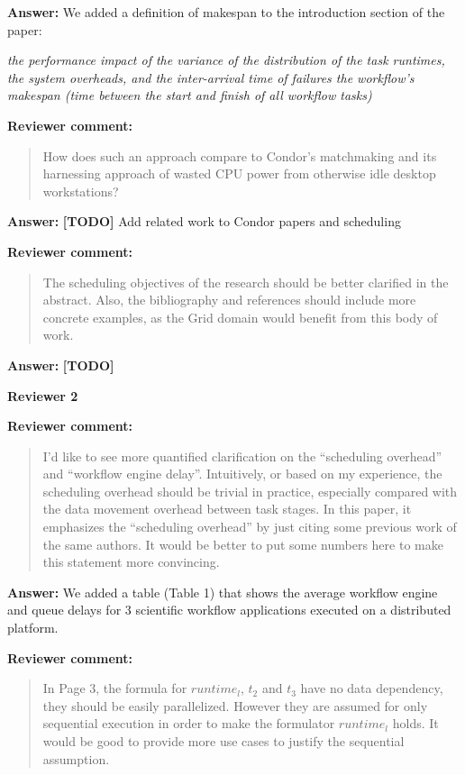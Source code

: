 \documentclass{letter}
\newenvironment{review}%
{\textbf{Reviewer comment:}\begin{quote}}%
{\end{quote}}%
\newcommand{\todo}[1]{%
      \color{red}\textbf{[TODO]} #1\color{black}}
\newcommand{\answer}[1]{%
      \textbf{Answer:} #1}
\newcommand{\revised}[1]{\emph{#1}\color{black}}
\begin{document}
\begin{letter}{}
\answer{We added a definition of makespan to the introduction section of the paper:}

\revised{the performance impact of the variance of the distribution of the task runtimes, the system overheads, and the inter-arrival time of failures the workflow's makespan (time between the start and finish of all workflow tasks)}



\begin{review}
How does such an approach compare to Condor's matchmaking and its harnessing approach of wasted CPU power from otherwise idle desktop workstations?
\end{review}

\answer{\todo{Add related work to Condor papers and scheduling}}



\begin{review}
The scheduling objectives of the research should be better clarified in the abstract. Also, the bibliography and references should include more concrete examples, as the Grid domain would benefit from this body of work. 
\end{review}

\answer{\todo{}}



\newpage

%
%
\textbf{Reviewer 2}

\begin{review}
I'd like to see more quantified clarification on the ``scheduling overhead'' and ``workflow engine delay''. Intuitively, or based on my experience, the scheduling overhead should be trivial in practice, especially compared with the data movement overhead between task stages. In this paper, it emphasizes the ``scheduling overhead'' by just citing some previous work of the same authors. It would be better to put some numbers here to make this statement more convincing. 
\end{review}

\answer{We added a table (Table 1) that shows the average workflow engine and queue delays for 3 scientific workflow applications executed on a distributed platform.}



\begin{review}
In Page 3, the formula for $runtime_l$, $t_2$ and $t_3$ have no data dependency, they should be easily parallelized. However they are assumed for only sequential execution in order to make the formulator $runtime_l$ holds. It would be good to provide more use cases to justify the sequential assumption.
\end{review}


\end{letter}
\end{document}
